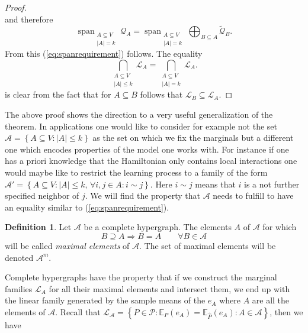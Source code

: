 \documentclass[12pt]{amsart}
\newcommand{\set}[1]{\left\lbrace #1 \right\rbrace} %
\renewcommand{\subset}{\subseteq}  %
\renewcommand{\supset}{\supseteq}
\DeclareMathOperator*{\spann}{span}
\newcommand{\E}{\mathbb{E}} %
\theoremstyle{plain}%
\theoremstyle{definition}
\newtheorem{defn}[thm]{Definition}
\theoremstyle{remark}
\begin{document}
{\begin{proof}
\begin{equation*}
  \end{equation*}
and therefore
  \begin{equation*}
      \spann_{\substack{A \subset V \\ |A| = k}} \mathcal{Q}_A = \spann_{\substack{A \subset V \\ |A| = k}} \bigoplus_{B\subset A} \tilde{\mathcal{Q}}_B.
  \end{equation*} From this (\ref{eq:spanrequirement}) follows. 
The equality
 \begin{equation*}
      \bigcap_{\substack{A \subset V \\|A| \leq k}} \mathcal{L}_A  = \bigcap_{\substack{A \subset V \\|A| = k}} \mathcal{L}_A.
  \end{equation*} is clear from the fact that for $A \subset B$ follows that $\mathcal{L}_B\subset \mathcal{L}_A$.
\end{proof}

The above proof shows the direction to a very useful generalization of
the theorem. In applications one would like to consider for example
not the set $\mathcal{A} = \set{A\subset V: |A|\leq k}$ as the set on
which we fix the marginals but a different one which encodes
properties of the model one works with. For instance if one has a
priori knowledge that the Hamiltonian only contains local interactions
one would maybe like to restrict the learning process to a family of
the form $\mathcal{A}' = \set{A\subset V : |A|\leq k,\, \forall i,j\in
  A: i\sim j}$. Here $i\sim j$ means that $i$ is a not further
specified neighbor of $j$. We will find the property that $\mathcal{A}$ needs to fulfill to have an equality similar to (\ref{eq:spanrequirement}).
}

\begin{defn}
  Let $\mathcal{A}$ be a complete hypergraph.  The elements $A$ of
  $\mathcal{A}$ for which
\begin{equation*}
  \label{eq:maximalelementsdefinition}
  B \supset A \Rightarrow B = A \qquad \forall B\in\mathcal{A}
\end{equation*}
will be called \emph{maximal elements} of
$\mathcal{A}$. The set of maximal elements will be denoted
$\mathcal{A}^m$. 
\end{defn}

Complete hypergraphs have the property that if we construct the
marginal families $\mathcal{L}_A$ for all their maximal elements and
intersect them, we end up with the linear family generated by the
sample means of the $e_A$ where $A$ are all the elements of
$\mathcal{A}$. Recall that $\mathcal{L}_{\mathcal{A}} =
\set{P\in\mathcal{P} : \E_{P}(e_A) = \E_{\hat{P}}(e_A) :
  A\in\mathcal{A}}$, then we have
\end{document}

